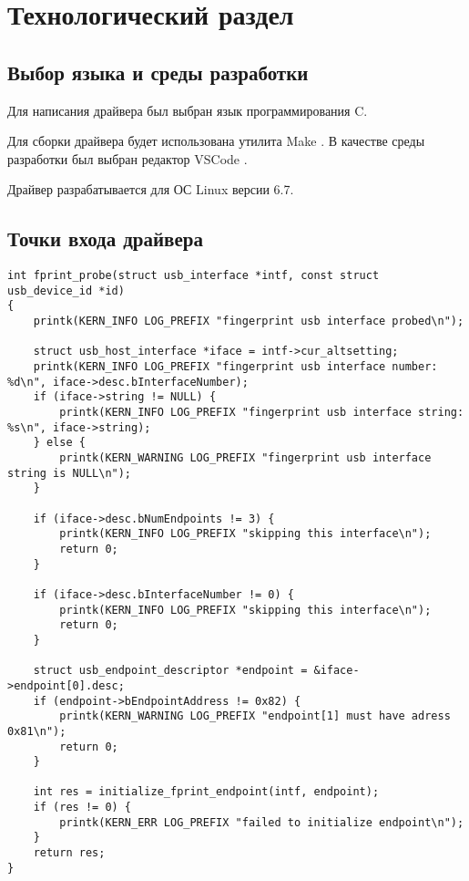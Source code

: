 \chapter{Технологический раздел}

\section{Выбор языка и среды разработки}

Для написания драйвера был выбран язык программирования C.

Для сборки драйвера будет использована утилита Make \cite{toolbox}. В качестве среды разработки был выбран редактор VSCode \cite{vscode}.

Драйвер разрабатывается для ОС Linux версии 6.7.

\section{Точки входа драйвера}

\begin{lstlisting}[caption={функция \texttt{probe} драйвера}]
int fprint_probe(struct usb_interface *intf, const struct usb_device_id *id)
{
    printk(KERN_INFO LOG_PREFIX "fingerprint usb interface probed\n");

    struct usb_host_interface *iface = intf->cur_altsetting;
    printk(KERN_INFO LOG_PREFIX "fingerprint usb interface number: %d\n", iface->desc.bInterfaceNumber);
    if (iface->string != NULL) {
        printk(KERN_INFO LOG_PREFIX "fingerprint usb interface string: %s\n", iface->string);
    } else {
        printk(KERN_WARNING LOG_PREFIX "fingerprint usb interface string is NULL\n");
    }

    if (iface->desc.bNumEndpoints != 3) {
        printk(KERN_INFO LOG_PREFIX "skipping this interface\n");
        return 0;
    }

    if (iface->desc.bInterfaceNumber != 0) {
        printk(KERN_INFO LOG_PREFIX "skipping this interface\n");
        return 0;
    }

    struct usb_endpoint_descriptor *endpoint = &iface->endpoint[0].desc;
    if (endpoint->bEndpointAddress != 0x82) {
        printk(KERN_WARNING LOG_PREFIX "endpoint[1] must have adress 0x81\n");
        return 0;
    }

    int res = initialize_fprint_endpoint(intf, endpoint);
    if (res != 0) {
        printk(KERN_ERR LOG_PREFIX "failed to initialize endpoint\n");
    }
    return res;
}
\end{lstlisting}

